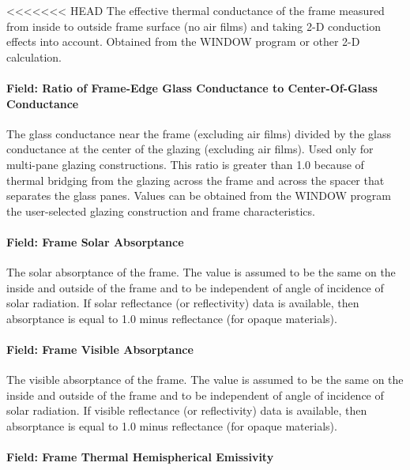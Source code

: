 <<<<<<< HEAD
The effective thermal conductance of the frame measured from inside to outside frame surface (no air films) and taking 2-D conduction effects into account. Obtained from the WINDOW program or other 2-D calculation.

\paragraph{Field: Ratio of Frame-Edge Glass Conductance to Center-Of-Glass Conductance}\label{field-ratio-of-frame-edge-glass-conductance-to-center-of-glass-conductance}

The glass conductance near the frame (excluding air films) divided by the glass conductance at the center of the glazing (excluding air films). Used only for multi-pane glazing constructions. This ratio is greater than 1.0 because of thermal bridging from the glazing across the frame and across the spacer that separates the glass panes. Values can be obtained from the WINDOW program the user-selected glazing construction and frame characteristics.

\paragraph{Field: Frame Solar Absorptance}\label{field-frame-solar-absorptance}

The solar absorptance of the frame. The value is assumed to be the same on the inside and outside of the frame and to be independent of angle of incidence of solar radiation. If solar reflectance (or reflectivity) data is available, then absorptance is equal to 1.0 minus reflectance (for opaque materials).

\paragraph{Field: Frame Visible Absorptance}\label{field-frame-visible-absorptance}

The visible absorptance of the frame. The value is assumed to be the same on the inside and outside of the frame and to be independent of angle of incidence of solar radiation. If visible reflectance (or reflectivity) data is available, then absorptance is equal to 1.0 minus reflectance (for opaque materials).

\paragraph{Field: Frame Thermal Hemispherical Emissivity}\label{field-frame-thermal-hemispherical-emissivity}

